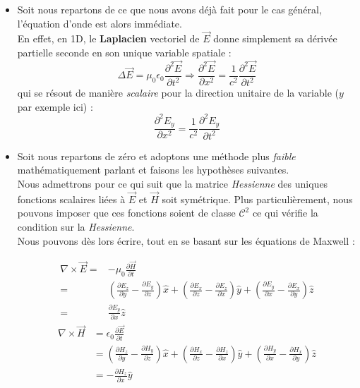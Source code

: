\begin{itemize}
	\item
Soit nous repartons de ce que nous avons déjà fait pour le cas général, l'équation d'onde est alors immédiate. \\
En effet, en 1D, le \textbf{Laplacien} vectoriel de $\vec{E}$ donne simplement sa dérivée partielle seconde en son unique variable
spatiale : 
\[ \Delta \vec{E} = \mu_{0} \epsilon_{0}  \frac{\partial^{2} \vec{E}}{\partial t^{2}} \Rightarrow \frac{\partial^{2} \vec{E} }{\partial x^2} = \frac{1}{c^{2}}  \frac{\partial^{2} \vec{E}}{\partial t^{2}}\]
qui se résout de manière \textit{scalaire} pour la direction unitaire de la variable ($y$ par exemple ici) : 
\[\frac{\partial^{2} E_{y}}{\partial x^{2}} = \frac{1}{c^{2}}  \frac{\partial^{2} E_{y}}{\partial t^{2}}\]


\item Soit nous repartons de zéro et adoptons une méthode plus \textit{faible} mathématiquement parlant et faisons les hypothèses suivantes.\\
Nous admettrons pour ce qui suit que la matrice \textit{Hessienne} des uniques fonctions scalaires liées à $\vec{E}$ et $\vec{H}$ soit symétrique. 
Plus particulièrement, nous pouvons imposer que ces fonctions soient de classe $\mathcal{C}^{2}$ ce qui vérifie la condition sur la \textit{Hessienne}. \\ 

Nous pouvons dès lors écrire, tout en se basant sur les équations de Maxwell : 


\begin{equation*}
	\begin{split}
\nabla \times \vec{E} =& -\mu_{0} \frac{\partial \vec{H}}{\partial t} \\=& (\frac{\partial E_{z}}{\partial y} - \frac{\partial E_{y}}{\partial z})\hat{x} +   (\frac{\partial E_{x}}{\partial z} - \frac{\partial E_{z}}{\partial x})\hat{y} +
(\frac{\partial E_{y}}{\partial x} - \frac{\partial E_{x}}{\partial y})\hat{z} \\=& \frac{\partial E_{y}}{\partial x} \hat{z}
	\end{split}
\end{equation*}
\begin{equation*}
\begin{split}
\nabla \times \vec{H} &= \epsilon_{0} \frac{\partial \vec{E}}{\partial t} \\&= (\frac{\partial H_{z}}{\partial y} - \frac{\partial H_{y}}{\partial z})\hat{x} +   (\frac{\partial H_{x}}{\partial z} - \frac{\partial H_{z}}{\partial x})\hat{y} +
(\frac{\partial H_{y}}{\partial x} - \frac{\partial H_{x}}{\partial y})\hat{z} \\&= -\frac{\partial H_{z}}{\partial x} \hat{y}
	\end{split}
\end{equation*}


\end{itemize}
